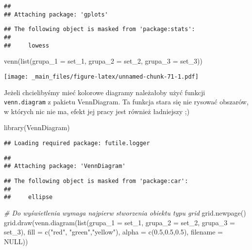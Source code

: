 \documentclass[
]{book}
\newenvironment{Shaded}{\begin{snugshade}}{\end{snugshade}}
\newcommand{\AttributeTok}[1]{\textcolor[rgb]{0.77,0.63,0.00}{#1}}
\newcommand{\CommentTok}[1]{\textcolor[rgb]{0.56,0.35,0.01}{\textit{#1}}}
\newcommand{\ConstantTok}[1]{\textcolor[rgb]{0.00,0.00,0.00}{#1}}
\newcommand{\FloatTok}[1]{\textcolor[rgb]{0.00,0.00,0.81}{#1}}
\newcommand{\FunctionTok}[1]{\textcolor[rgb]{0.00,0.00,0.00}{#1}}
\newcommand{\NormalTok}[1]{#1}
\newcommand{\StringTok}[1]{\textcolor[rgb]{0.31,0.60,0.02}{#1}}
\begin{document}
\begin{verbatim}
## 
## Attaching package: 'gplots'
\end{verbatim}

\begin{verbatim}
## The following object is masked from 'package:stats':
## 
##     lowess
\end{verbatim}

\begin{Shaded}
\begin{Highlighting}[]
\FunctionTok{venn}\NormalTok{(}\FunctionTok{list}\NormalTok{(}\AttributeTok{grupa\_1 =}\NormalTok{ set\_1, }\AttributeTok{grupa\_2 =}\NormalTok{ set\_2, }\AttributeTok{grupa\_3 =}\NormalTok{ set\_3))}
\end{Highlighting}
\end{Shaded}

\texttt{[image: \_main\_files/figure-latex/unnamed-chunk-71-1.pdf]}

Jeżeli chcielibyśmy mieć kolorowe diagramy należałoby użyć funkcji \texttt{venn.diagram} z pakietu VennDiagram. Ta funkcja stara się nie rysować obszarów, w których nic nie ma, efekt jej pracy jest również ładniejszy ;)

\begin{Shaded}
\begin{Highlighting}[]
\FunctionTok{library}\NormalTok{(VennDiagram)}
\end{Highlighting}
\end{Shaded}

\begin{verbatim}
## Loading required package: futile.logger
\end{verbatim}

\begin{verbatim}
## 
## Attaching package: 'VennDiagram'
\end{verbatim}

\begin{verbatim}
## The following object is masked from 'package:car':
## 
##     ellipse
\end{verbatim}

\begin{Shaded}
\begin{Highlighting}[]
\CommentTok{\# Do wyświetlenia wymaga najpierw stworzenia obiektu typu grid}
\FunctionTok{grid.newpage}\NormalTok{()}
\FunctionTok{grid.draw}\NormalTok{(}\FunctionTok{venn.diagram}\NormalTok{(}\FunctionTok{list}\NormalTok{(}\AttributeTok{grupa\_1 =}\NormalTok{ set\_1, }\AttributeTok{grupa\_2 =}\NormalTok{ set\_2, }\AttributeTok{grupa\_3 =}\NormalTok{ set\_3), }
                       \AttributeTok{fill =} \FunctionTok{c}\NormalTok{(}\StringTok{"red"}\NormalTok{, }\StringTok{"green"}\NormalTok{,}\StringTok{"yellow"}\NormalTok{), }
                       \AttributeTok{alpha =} \FunctionTok{c}\NormalTok{(}\FloatTok{0.5}\NormalTok{,}\FloatTok{0.5}\NormalTok{,}\FloatTok{0.5}\NormalTok{), }
                       \AttributeTok{filename =} \ConstantTok{NULL}\NormalTok{))}
\end{Highlighting}
\end{Shaded}
\end{document}
